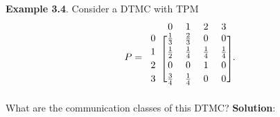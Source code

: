 \begin{Example}
    \textbf{Example 3.4}. Consider a DTMC with TPM
    \[ P=\begin{blockarray}{cccccc}
            & 0 & 1 & 2 & 3 \\
            \begin{block}{c[ccccc]}
                0 & \frac{1}{3} & \frac{2}{3} & 0 & 0 \\[2pt]
                1 & \frac{1}{2} & \frac{1}{4} & \frac{1}{4} & \frac{1}{4} \\[2pt]
                2 & 0 & 0 & 1 & 0 \\[2pt]
                3 & \frac{3}{4} & \frac{1}{4} & 0 & 0\\
            \end{block}
        \end{blockarray}. \]
    What are the communication classes of this DTMC\@?
    \tcblower{}
    \textbf{Solution}:
\end{Example}
